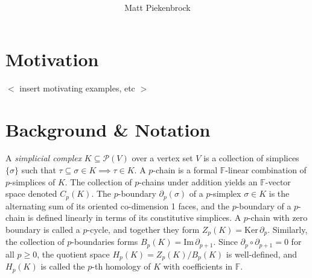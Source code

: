 \documentclass[10pt]{article}
\title{\vspace{-2.0em} \vspace{-0.5em}}
\author{Matt Piekenbrock}
\date{}
\begin{document}
\noindent

\section{Motivation}
$<$ insert motivating examples, etc $>$

\section{Background \& Notation}
A \emph{simplicial complex} $K \subseteq \mathcal{P}(V)$ over a vertex set $V$ is a collection of simplices $\{\sigma\}$ such that $\tau \subseteq \sigma \in K \implies \tau \in K$. A $p$-chain is a formal $\mathbb{F}$-linear combination of $p$-simplices of $K$. The collection of $p$-chains under addition yields an $\mathbb{F}$-vector space denoted $C_p(K)$. 
The $p$-boundary $\partial_p(\sigma)$ of a $p$-simplex $\sigma\in K$ is the alternating sum of its oriented co-dimension 1 faces, and the $p$-boundary of a $p$-chain is defined linearly in terms of its constitutive simplices. 
A $p$-chain with zero boundary is called a $p$-cycle, and together they form $Z_p(K) = \mathrm{Ker}\,\partial_p$. Similarly, the collection of $p$-boundaries forms  $B_p(K) = \mathrm{Im}\,\partial_{p+1}$. Since $\partial_p \circ \partial_{p+1} = 0$ for all $p\geq 0$, the quotient space $H_p(K) = Z_p(K) / B_{p}(K)$ is well-defined, and $H_p(K)$ is called the $p$-th homology of $K$ with coefficients in $\mathbb{F}$. 
\end{document}
